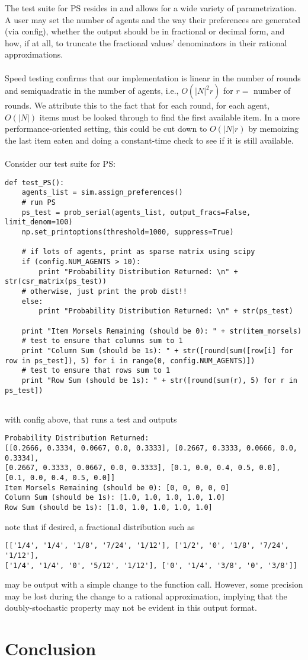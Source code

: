 \documentclass[12pt]{article}
\begin{document}
The test suite for PS resides in  and allows for a wide variety of parametrization. A user may set the number of agents and the way their preferences are generated (via config), whether the output should be in fractional or decimal form, and how, if at all, to truncate the fractional values' denominators in their rational approximations.\\\\Speed testing confirms that our implementation is linear in the number of rounds and semiquadratic in the number of agents, i.e., $O(|N|^2r)$ for $r=$ number of rounds. We attribute this to the fact that for each round, for each agent, $O(|N|)$ items must be looked through to find the first available item. In a more performance-oriented setting, this could be cut down to $O(|N|r)$ by memoizing the last item eaten and doing a constant-time check to see if it is still available.\\\\Consider our test suite for PS: 
\begin{verbatim} 
def test_PS(): 
    agents_list = sim.assign_preferences() 
    # run PS 
    ps_test = prob_serial(agents_list, output_fracs=False, limit_denom=100) 
    np.set_printoptions(threshold=1000, suppress=True) 
 
    # if lots of agents, print as sparse matrix using scipy 
    if (config.NUM_AGENTS > 10): 
        print "Probability Distribution Returned: \n" + str(csr_matrix(ps_test)) 
    # otherwise, just print the prob dist!! 
    else: 
        print "Probability Distribution Returned: \n" + str(ps_test) 
 
    print "Item Morsels Remaining (should be 0): " + str(item_morsels) 
    # test to ensure that columns sum to 1 
    print "Column Sum (should be 1s): " + str([round(sum([row[i] for row in ps_test]), 5) for i in range(0, config.NUM_AGENTS)]) 
    # test to ensure that rows sum to 1 
    print "Row Sum (should be 1s): " + str([round(sum(r), 5) for r in ps_test]) 
 
\end{verbatim} 
\noindent with config above, that runs a test and outputs 
 
\begin{verbatim} 
Probability Distribution Returned:  
[[0.2666, 0.3334, 0.0667, 0.0, 0.3333], [0.2667, 0.3333, 0.0666, 0.0, 0.3334], 
[0.2667, 0.3333, 0.0667, 0.0, 0.3333], [0.1, 0.0, 0.4, 0.5, 0.0],  
[0.1, 0.0, 0.4, 0.5, 0.0]] 
Item Morsels Remaining (should be 0): [0, 0, 0, 0, 0] 
Column Sum (should be 1s): [1.0, 1.0, 1.0, 1.0, 1.0] 
Row Sum (should be 1s): [1.0, 1.0, 1.0, 1.0, 1.0] 
\end{verbatim} 
\noindent note that if desired, a fractional distribution such as  
\begin{verbatim} 
[['1/4', '1/4', '1/8', '7/24', '1/12'], ['1/2', '0', '1/8', '7/24', '1/12'], 
['1/4', '1/4', '0', '5/12', '1/12'], ['0', '1/4', '3/8', '0', '3/8']] 
\end{verbatim} 
\noindent may be output with a simple change to the function call. However, some precision may be lost during the change to a rational approximation, implying that the doubly-stochastic property may not be evident in this output format. 
\section*{Conclusion}
\end{document}
